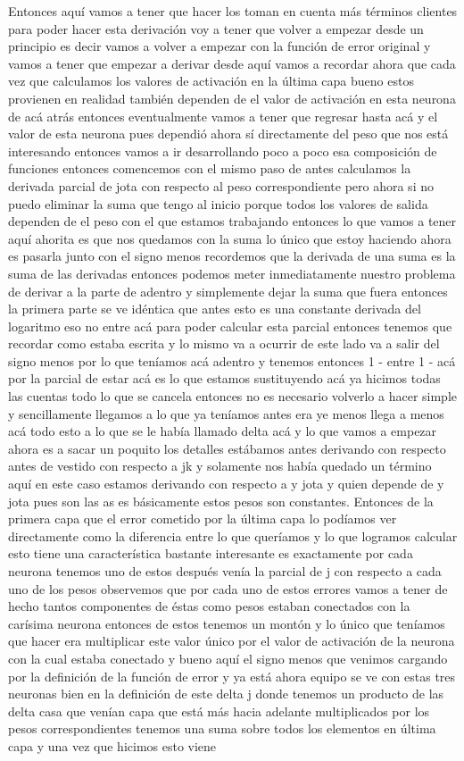 Entonces aquí vamos a tener que hacer los toman en cuenta más términos clientes para poder hacer esta derivación voy a tener que volver a empezar desde un principio es decir vamos a volver a empezar con la función de error original y vamos a tener que empezar a derivar desde aquí vamos a recordar ahora que cada vez que calculamos los valores de activación en la última capa bueno estos provienen en realidad también dependen de el valor de activación en esta neurona de acá atrás entonces eventualmente vamos a tener que regresar hasta acá y el valor de esta neurona pues dependió ahora sí directamente del peso que nos está interesando entonces vamos a ir desarrollando poco a poco esa composición de funciones entonces comencemos con el mismo paso de antes calculamos la derivada parcial de jota con respecto al peso correspondiente pero ahora si no puedo eliminar la suma que tengo al inicio porque todos los valores de salida dependen de el peso con el que estamos trabajando entonces lo que vamos a tener aquí ahorita es que nos quedamos con la suma lo único que estoy haciendo ahora es pasarla junto con el signo menos recordemos que la derivada de una suma es la suma de las derivadas entonces podemos meter inmediatamente nuestro problema de derivar a la parte de adentro y simplemente dejar la suma que fuera entonces la primera parte se ve idéntica que antes esto es una constante derivada del logaritmo eso no entre acá para poder calcular esta parcial entonces tenemos que recordar como estaba escrita y lo mismo va a ocurrir de este lado va a salir del signo menos por lo que teníamos acá adentro y tenemos entonces 1 - entre 1 - acá por la parcial de estar acá es lo que estamos sustituyendo acá ya hicimos todas las cuentas todo lo que se cancela entonces no es necesario volverlo a hacer simple y sencillamente llegamos a lo que ya teníamos antes era ye menos llega a menos acá todo esto a lo que se le había llamado delta acá y lo que vamos a empezar ahora es a sacar un poquito los detalles estábamos antes derivando con respecto antes de vestido con respecto a jk y solamente nos había quedado un término aquí en este caso estamos derivando con respecto a y jota y quien depende de y jota pues son las as es básicamente estos pesos son constantes. Entonces de la primera capa que el error cometido por la última capa lo podíamos ver directamente como la diferencia entre lo que queríamos y lo que logramos calcular esto tiene una característica bastante interesante es exactamente por cada neurona tenemos uno de estos después venía la parcial de j con respecto a cada uno de los pesos observemos que por cada uno de estos errores vamos a tener de hecho tantos componentes de éstas como pesos estaban conectados con la carísima neurona entonces de estos tenemos un montón y lo único que teníamos que hacer era multiplicar este valor único por el valor de activación de la neurona con la cual estaba conectado y bueno aquí el signo menos que venimos cargando por la definición de la función de error y ya está ahora equipo se ve con estas tres neuronas bien en la definición de este delta j donde tenemos un producto de las delta casa que venían capa que está más hacia adelante multiplicados por los pesos correspondientes tenemos una suma sobre todos los elementos en última capa y una vez que hicimos esto viene 